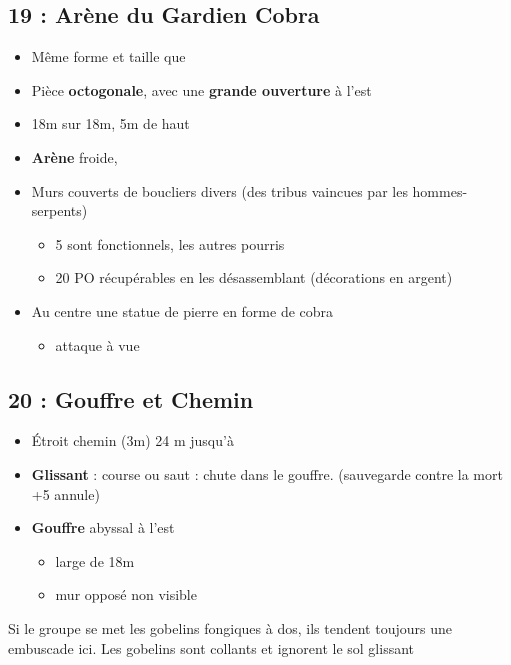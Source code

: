 \vfill

\subsection{19 : Arène du Gardien Cobra}\label{n2:s19}
\begin{itemize}
    \item Même forme et taille que 
    \item Pièce \textbf{octogonale}, avec une \textbf{grande ouverture} à l'est
    \item 18m sur 18m, 5m de haut
    \item \textbf{Arène} froide,
    \item Murs couverts de boucliers divers (des tribus vaincues par les hommes-serpents)
    \begin{itemize}
      \item 5 sont fonctionnels, les autres pourris
      \item 20 PO récupérables en les désassemblant (décorations en argent)
    \end{itemize}
    \item Au centre une statue de pierre en forme de cobra
    \begin{itemize}
      \item \textbf{} attaque à vue
    \end{itemize}
\end{itemize}

\subsection{20 : Gouffre et Chemin}\label{n2:s20}
\begin{itemize}
  \item \'Etroit chemin (3m) 24 m jusqu'à \textbf{}
  \item \textbf{Glissant} : course ou saut : chute dans le gouffre.
  (sauvegarde contre la mort +5 annule)
  \item \textbf{Gouffre} abyssal à l'est
  \begin{itemize}
    \item large de 18m
    \item mur opposé non visible
  \end{itemize}
\end{itemize}
Si le groupe se met les gobelins fongiques à dos, ils tendent toujours une embuscade ici.
Les gobelins sont collants et ignorent le sol glissant

